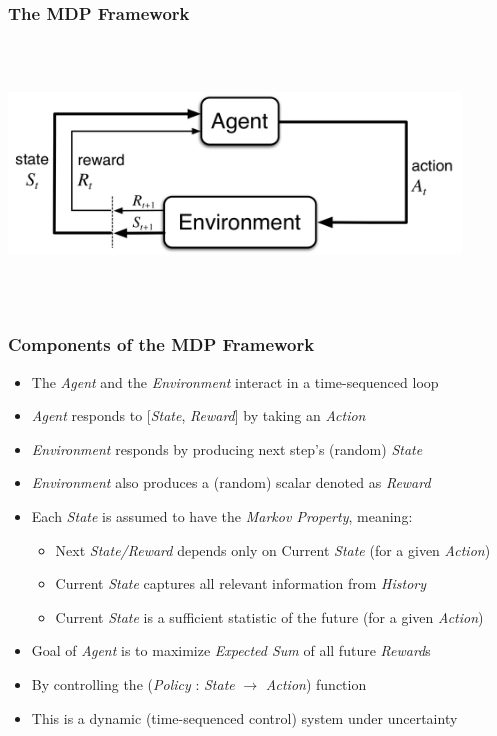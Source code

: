 \documentclass[handout]{beamer}
\begin{document}
\begin{frame}
\frametitle{The MDP Framework}
\includegraphics[width=12cm, height=7cm]{MDP.png}
\end{frame}

\begin{frame}
\frametitle{Components of the MDP Framework}
\pause
\begin{itemize}[<+->]
\item The {\em Agent} and the {\em Environment} interact in a time-sequenced loop
\item {\em Agent} responds to [{\em State}, {\em Reward}] by taking an {\em Action}
\item {\em Environment} responds by producing next step's (random) {\em State}
\item {\em Environment} also produces a (random) scalar denoted as {\em Reward}
\item Each {\em State} is assumed to have the {\em Markov Property}, meaning:
\begin{itemize}
\item Next {\em State/Reward} depends only on Current {\em State} (for a given {\em Action})
\item Current {\em State} captures all relevant information from {\em History}
\item Current {\em State} is a sufficient statistic of the future (for a given {\em Action})
\end{itemize} 
\item Goal of {\em Agent} is to maximize {\em Expected Sum} of all future {\em Reward}s
\item By controlling the ({\em Policy} : {\em State} $\rightarrow$ {\em Action}) function
\item This is a dynamic (time-sequenced control) system under uncertainty
\end{itemize}
\end{frame}
\end{document}

